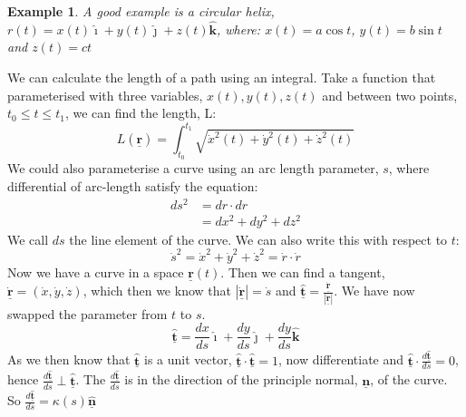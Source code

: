 \documentclass{article}
\renewcommand{\vec}[1]{\underline{\textbf{#1}}}
\newcommand{\veci}{\bm{\hat{\imath}}}
\newcommand{\vecj}{\bm{\hat{\jmath}}}
\newcommand{\veck}{\bm{\hat{k}}}
\newcommand{\vecn}{\underline{\mathbf{\hat{n}}}}
\newtheorem{example}{Example}
\begin{document}
\begin{example}
   A good example is a circular helix, $r(t) = x(t)\veci + y(t)\vecj + z(t)\veck$, where: $x(t) = a\cos t$, $y(t) = b\sin{t}$ and $z(t) = ct$
\end{example}\vspace{10pt}
\begin{figure}[H]
  \centering
\end{figure}

We can calculate the length of a path using an integral. Take a function that parameterised with three variables, $x(t), y(t), z(t)$ and between two points, $t_0\le t\le t_1$, we can find the length, L:
$$ L(\vec r) = \int_{t_0}^{t_1}{\sqrt{\dot x^2(t) + \dot y^2(t) + \dot z^2(t)}} $$
We could also parameterise a curve using an arc length parameter, $s$, where differential of arc-length satisfy the equation:
\begin{align*}
  ds^2 &= dr \cdot dr \\
  &= dx^2 + dy^2 + dz^2
\end{align*}
We call $ds$ the line element of the curve. We can also write this with respect to $t$:
$$ \dot s^2 = \dot x^2 + \dot y^2 + \dot z^2 = \dot r \cdot \dot r$$
Now we have a curve in a space $\vec r(t)$. Then we can find a tangent, $\dot{\vec r} = (\dot x, \dot y, \dot z)$, which then we know that $\displaystyle{|\dot{ \vec r}| = \dot s}$ and $\displaystyle{\hat{\vec t} = \frac{\dot{\vec r}}{|\dot{\vec r}|}}$. We have now swapped the parameter from $t$ to $s$.
$$ \hat{\vec t} = {\frac{dx}{ds}} \veci + {\frac{dy}{ds}} \vecj + {\frac{dy}{ds}} \veck $$
As we then know that $\hat{\vec t}$ is a unit vector, $\hat{\vec t}\cdot\hat{\vec t} = 1$, now differentiate and $\displaystyle{\hat{\vec t} \cdot \frac{d\hat{\vec t}}{ds} = 0}$, hence $\displaystyle{\frac{d\hat{\vec t}}{ds}} \perp \hat{\vec t}$. The $\frac{d\hat{\vec t}}{ds}$ is in the direction of the principle normal, $\vec n$, of the curve. So $\frac{d\hat{\vec t}}{ds} = \kappa(s)\vecn$\\
\end{document}
